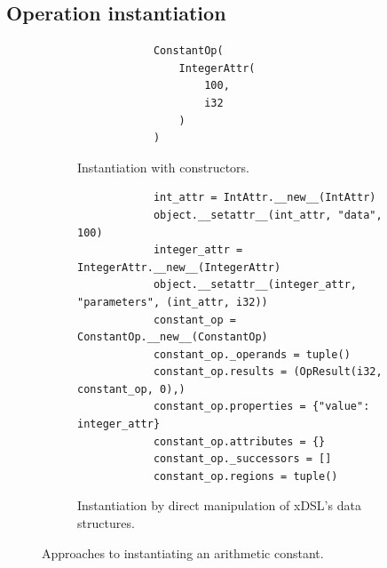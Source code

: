 \subsection{Operation instantiation}
\label{sec:specialising-ubenchmarks-instantiation}


\begin{figure}[H]
    \begin{subfigure}[b]{0.4\textwidth}
       \centering
        \begin{verbatim}
            ConstantOp(
                IntegerAttr(
                    100,
                    i32
                )
            )
        \end{verbatim}
        \footnotesize\vspace{3em}
        \caption{Instantiation with constructors.}
        \label{listing:ubenchmark-xdsl-constant-constructor}
    \end{subfigure}
    \hfill
    \begin{subfigure}[b]{0.6\textwidth}
        \centering
        \begin{verbatim}
            int_attr = IntAttr.__new__(IntAttr)
            object.__setattr__(int_attr, "data", 100)
            integer_attr = IntegerAttr.__new__(IntegerAttr)
            object.__setattr__(integer_attr, "parameters", (int_attr, i32))
            constant_op = ConstantOp.__new__(ConstantOp)
            constant_op._operands = tuple()
            constant_op.results = (OpResult(i32, constant_op, 0),)
            constant_op.properties = {"value": integer_attr}
            constant_op.attributes = {}
            constant_op._successors = []
            constant_op.regions = tuple()
        \end{verbatim}
        \caption{Instantiation by direct manipulation of xDSL's data structures.}
        \label{listing:ubenchmark-xdsl-constant-direct}
    \end{subfigure}
    \captionsetup{name=Listing}
    \caption{Approaches to instantiating an arithmetic constant.}
    \label{listing:ubenchmark-xdsl-constant}
\end{figure}


